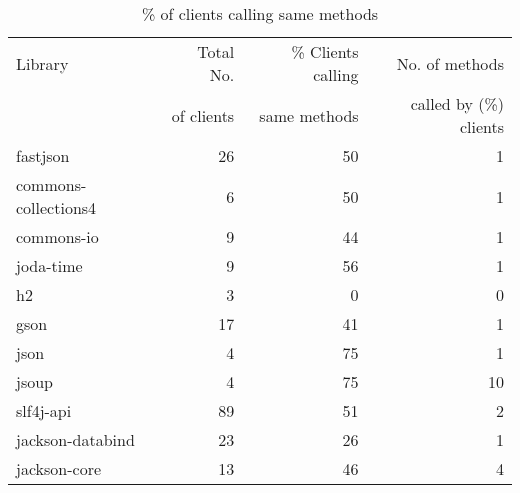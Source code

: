 \begin{table}[ht]
\centering
\begingroup\small
\begin{tabular}{l!{\color{verylightgray}\vrule}rrr}
Library & Total No.  & \% Clients calling  & No. of methods  \\ 
 & of clients & same methods & called by (\%) clients \\
   \hline
fastjson & 26 & 50 & 1 \\ 
  commons-collections4 & 6 & 50 & 1 \\ 
  commons-io & 9 & 44 & 1 \\ 
  joda-time & 9 & 56 & 1 \\ 
  h2 & 3 & 0 & 0 \\ 
  gson & 17 & 41 & 1 \\ 
  json & 4 & 75 & 1 \\ 
  jsoup & 4 & 75 & 10 \\ 
  slf4j-api & 89 & 51 & 2 \\ 
  jackson-databind & 23 & 26 & 1 \\ 
  jackson-core & 13 & 46 & 4 \\ 
\end{tabular}
\endgroup
\caption{\label{tab:same-method}\% of clients calling same methods} 
\end{table}
